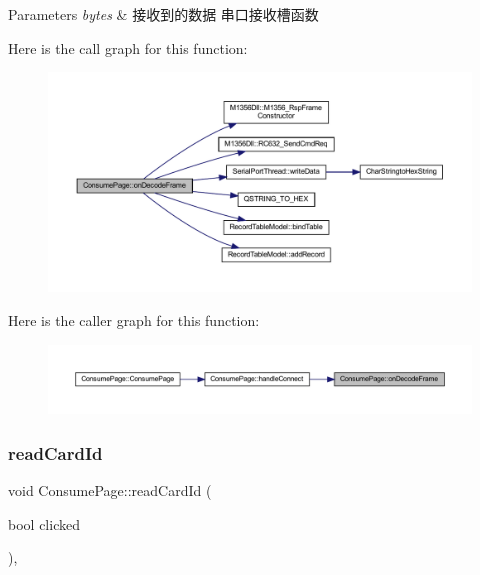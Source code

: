 \begin{DoxyParams}{Parameters}
{\em bytes} & 接收到的数据 串口接收槽函数 \\
\hline
\end{DoxyParams}
Here is the call graph for this function\+:
\nopagebreak
\begin{figure}[H]
\begin{center}
\leavevmode
\includegraphics[width=350pt]{class_consume_page_aad2165e62407257cd5a061a75e3e8cd2_cgraph}
\end{center}
\end{figure}
Here is the caller graph for this function\+:
\nopagebreak
\begin{figure}[H]
\begin{center}
\leavevmode
\includegraphics[width=350pt]{class_consume_page_aad2165e62407257cd5a061a75e3e8cd2_icgraph}
\end{center}
\end{figure}
\mbox{\label{class_consume_page_a00810bb404e95cf82b060d366a127b23}} 
\subsubsection{\texorpdfstring{readCardId}{readCardId}}
{\footnotesize\ttfamily void Consume\+Page\+::read\+Card\+Id (\begin{DoxyParamCaption}\item[{bool}]{clicked }\end{DoxyParamCaption})\hspace{0.3cm}{\ttfamily [private]}, {\ttfamily [slot]}}



